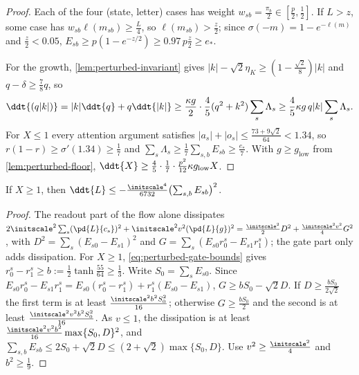 \begin{proof}
Each of the four (state, letter) cases has weight $w_{sb}=\frac{\pi_b}2\in[\frac p2,\frac12]$. If $L>z$, some case has $w_{sb}\ell(m_{sb})\ge\frac L4$,
so $\ell(m_{sb})>\frac z2$; since $\sigma(-m)=1-e^{-\ell(m)}$ and $\frac z2<0.05$, $E_{sb}\ge p(1-e^{-z/2})\ge0.97\,p\frac z2\ge e_\ast$.

For the growth, \cref{lem:perturbed-invariant} gives $|k|-\sqrt2\eta_K\ge(1-\frac{\sqrt2}8)|k|$ and $q-\delta\ge\frac78q$, so
\[
 \ddt{(q|k|)}=|k|\ddt{q}+q\ddt{|k|}\ge\frac{\kappa g}2\cdot\frac45(q^2+k^2)\sum_s\Lambda_s\ge\frac45\kappa g\,q|k|\sum_s\Lambda_s .
\]
For $X\le1$ every attention argument satisfies $|a_s|+|o_s|\le\frac{73+9\sqrt2}{64}<1.34$, so $r(1-r)\ge\sigma'(1.34)\ge\frac17$ and
$\sum_s\Lambda_s\ge\frac17\sum_{s,b}E_{sb}\ge\frac{e_\ast}7$. With $g\ge g_{\mathrm{low}}$ from \cref{lem:perturbed-floor},
$\ddt{X}\ge\frac45\cdot\frac17\cdot\frac{p^2}{12}\kappa g_{\mathrm{low}}X$.
\end{proof}

\begin{lemma}
\label{lem:perturbed-descent}
If $X\ge1$, then $\ddt{L}\le-\frac{\initscale^4}{6732}\bigl(\sum_{s,b}E_{sb}\bigr)^2$.
\end{lemma}

\begin{proof}
The readout part of the flow alone dissipates $2\initscale^2\sum_s(\pd{L}{c_s})^2+\initscale^2v^2(\pd{L}{g})^2
=\frac{\initscale^2}2D^2+\frac{\initscale^2v^2}4G^2$, with $D^2=\sum_s(E_{s0}-E_{s1})^2$ and $G=\sum_s(E_{s0}r^s_0-E_{s1}r^s_1)$; the gate part only adds
dissipation. For $X\ge1$, \cref{eq:perturbed-gate-bounds} gives $r^s_0-r^s_1\ge b:=\frac12\tanh\frac{55}{64}\ge\frac13$. Write $S_0=\sum_sE_{s0}$.
Since $E_{s0}r^s_0-E_{s1}r^s_1=E_{s0}(r^s_0-r^s_1)+r^s_1(E_{s0}-E_{s1})$, $G\ge bS_0-\sqrt2D$. If $D\ge\frac{bS_0}{2\sqrt2}$ the first term is at least
$\frac{\initscale^2b^2S_0^2}{16}$; otherwise $G\ge\frac{bS_0}2$ and the second is at least $\frac{\initscale^2v^2b^2S_0^2}{16}$. As $v\le1$, the dissipation is at
least $\frac{\initscale^2v^2b^2}{16}\max\{S_0,D\}^2$, and $\sum_{s,b}E_{sb}\le2S_0+\sqrt2D\le(2+\sqrt2)\max\{S_0,D\}$. Use $v^2\ge\frac{\initscale^2}4$ and
$b^2\ge\frac19$.
\end{proof}

